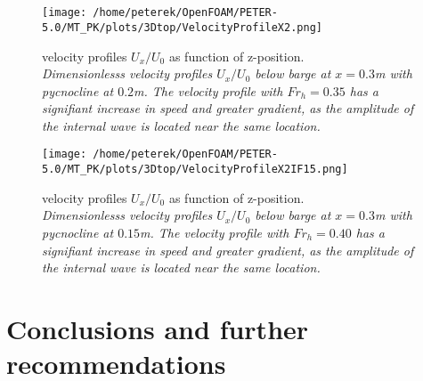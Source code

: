 \documentclass[a4paper, 12pt]{report}
\begin{document}
\\
\\
\begin{minipage}[t]{.45\textwidth} 
	\begin{figure}[H]
		\centering
		\texttt{[image: /home/peterek/OpenFOAM/PETER-5.0/MT\_PK/plots/3Dtop/VelocityProfileX2.png]}
		\caption{velocity profiles $U_x/U_0$ as function of z-position. \\ \textit{Dimensionlesss velocity profiles $U_x/U_0$ below barge at $x = 0.3$m with pycnocline at $0.2$m. The velocity profile with $Fr_h = 0.35$ has a signifiant increase in speed and greater gradient, as the amplitude of the internal wave is located near the same location.}}
		\label{fig:velocityProfileX2If2}
	\end{figure}
\end{minipage}\hfill
\vspace{2ex}
\begin{minipage}[t]{.45\textwidth}
	\begin{figure}[H]
		\centering
		\texttt{[image: /home/peterek/OpenFOAM/PETER-5.0/MT\_PK/plots/3Dtop/VelocityProfileX2IF15.png]}
		\caption{velocity profiles $U_x/U_0$ as function of z-position. \\ \textit{Dimensionlesss velocity profiles $U_x/U_0$ below barge at $x = 0.3$m with pycnocline at $0.15$m. The velocity profile with $Fr_h = 0.40$ has a signifiant increase in speed and greater gradient, as the amplitude of the internal wave is located near the same location.}}
		\label{fig:velocityProfileX2If15}
	\end{figure}
\end{minipage}\hfill
\vspace{2ex}

\chapter{Conclusions and further recommendations}
\end{document}
